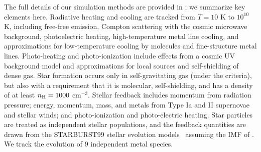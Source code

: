 \documentclass[fleqn,usenatbib]{mnras}
\begin{document}
The full details of our simulation methods are provided in \cite{Hopkins2017}; we summarize key elements here. 
Radiative heating and cooling are tracked from  $T=10$ K to $10^{10}$ K,  including free-free emission, Compton scattering with the cosmic microwave background, photoelectric heating, high-temperature metal line cooling, and approximations for low-temperature cooling by molecules  and fine-structure metal lines.
Photo-heating and photo-ionization include effects from a cosmic UV background model \citep{Faucher-Giguere2009} and approximations for local sources and self-shielding of dense gas.
Star formation occurs only in self-gravitating gas (under the \citealt{Hopkins2013b} criteria), but also with a requirement that it is molecular, self-shielding, and has a density of at least $n_{\rm H} = 1000$ cm$^{-3}$.
Stellar feedback includes momentum from radiation pressure;  energy, momentum, mass, and metals from Type Ia and II supernovae and stellar winds; and photo-ionization and photo-electric heating.
Star particles are treated as independent stellar populations, and the feedback quantities are drawn from the \textsc{STARBURST99} stellar evolution models~\citep{Leitherer1999} assuming the IMF of \cite{Kroupa2001}.
We track the evolution of 9 independent metal species.
\end{document}
